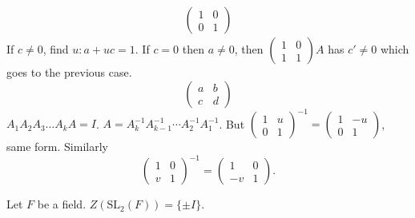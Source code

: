 \documentclass[10pt, a4paper]{article}
\begin{document}
\begin{problem}
\begin{solution}
\begin{align*}
\begin{pmatrix}
                1 & 0 \\ 0 & 1
            \end{pmatrix}
        \end{align*}
        If $c \neq 0$,
        find $u : a + uc = 1$.
        If $c = 0$ then $a \neq 0$,
        then $\begin{pmatrix}
            1 & 0 \\ 1 & 1
        \end{pmatrix}A$ has $c' \neq 0$ which goes to the previous case.
        \[
        \begin{pmatrix}
            a & b \\ c & d
        \end{pmatrix}
        \]
        $A_1A_2A_3\dotsc A_kA = I$.
        $A = A_k ^ {-1}A_{k - 1}^{-1}\dotsi A_2 ^ {-1}A_1 ^ {-1}$.
        But $\begin{pmatrix}
            1 & u \\ 0 & 1
        \end{pmatrix} ^ {-1} = \begin{pmatrix}
            1 & -u \\ 0 & 1
        \end{pmatrix}$,
        same form.
        Similarly
        \[
        \begin{pmatrix}
            1 & 0 \\ v & 1
        \end{pmatrix} ^ {-1} = \begin{pmatrix}
            1 & 0 \\ -v & 1
        \end{pmatrix}.
        \]
    \end{solution}
\end{problem}

\begin{problem}
    Let $F$ be a field.
    $Z(\mathrm{SL}_2(F)) = \{\pm I\}$.
\end{problem}
\end{document}
